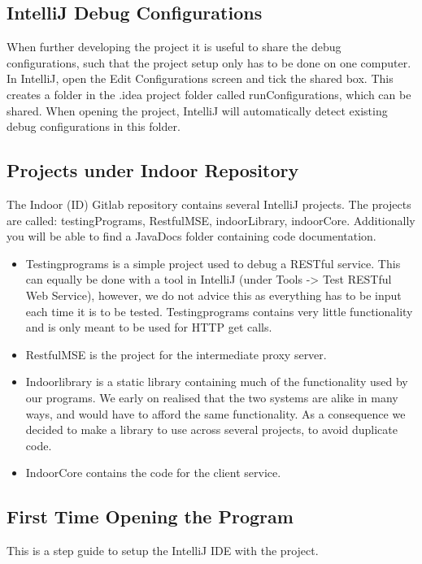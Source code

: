 \subsection*{IntelliJ Debug Configurations}
When further developing the project it is useful to share the debug configurations, such that the project setup only has to be done on one computer. In IntelliJ, open the Edit Configurations screen and tick the shared box. This creates a folder in the .idea project folder called runConfigurations, which can be shared. When opening the project, IntelliJ will automatically detect existing debug configurations in this folder.

\subsection*{Projects under Indoor Repository}
The Indoor (ID) Gitlab repository contains several IntelliJ projects. The projects are called: testingPrograms, RestfulMSE, indoorLibrary, indoorCore. Additionally you will be able to find a JavaDocs folder containing code documentation.

\begin{itemize}
\item Testingprograms is a simple project used to debug a RESTful service. This can equally be done with a tool in IntelliJ (under Tools -> Test RESTful Web Service), however, we do not advice this as everything has to be input each time it is to be tested. Testingprograms contains very little functionality and is only meant to be used for HTTP get calls.
\item RestfulMSE is the project for the intermediate proxy server. 
\item Indoorlibrary is a static library containing much of the functionality used by our programs. We early on realised that the two systems are alike in many ways, and would have to afford the same functionality. As a consequence we decided to make a library to use across several projects, to avoid duplicate code. 
\item IndoorCore contains the code for the client service. 
\end{itemize} 

\subsection*{First Time Opening the Program}
This is a step guide to setup the IntelliJ IDE with the project.

